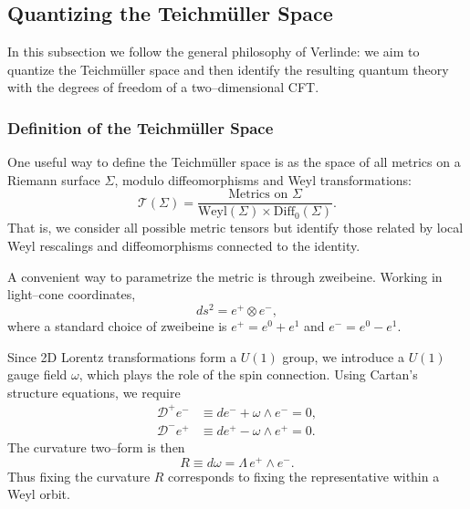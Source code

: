 \subsection{Quantizing the Teichmüller Space}

In this subsection we follow the general philosophy of Verlinde: 
we aim to quantize the Teichmüller space and then identify the resulting 
quantum theory with the degrees of freedom of a two–dimensional CFT.

\subsubsection{Definition of the Teichmüller Space}

One useful way to define the Teichmüller space is as the space of all metrics
on a Riemann surface $\Sigma$, modulo diffeomorphisms and Weyl transformations:
\begin{equation}
    \mathcal{T}(\Sigma)
    = \frac{\text{Metrics on }\Sigma}
    {\mathrm{Weyl}(\Sigma)\times \mathrm{Diff}_0(\Sigma)}.
\end{equation}
That is, we consider all possible metric tensors but identify those 
related by local Weyl rescalings and diffeomorphisms connected to the identity.

A convenient way to parametrize the metric is through zweibeine.  
Working in light–cone coordinates,
\begin{equation}
    ds^2 = e^{+} \otimes e^{-},
\end{equation}
where a standard choice of zweibeine is
$e^{+} = e^0 + e^1$ and $e^{-} = e^0 - e^1$.

Since 2D Lorentz transformations form a $U(1)$ group, 
we introduce a $U(1)$ gauge field $\omega$, which plays the role of the 
spin connection. Using Cartan's structure equations, we require
\begin{equation}
\begin{aligned}
    \mathcal{D}^{+} e^{-} 
    &\equiv de^{-} + \omega \wedge e^{-} = 0, \\
    \mathcal{D}^{-} e^{+} 
    &\equiv de^{+} - \omega \wedge e^{+} = 0.
\end{aligned}
\end{equation}
The curvature two–form is then
\begin{equation}
    R \equiv d\omega = \Lambda\, e^{+} \wedge e^{-}.
\end{equation}
Thus fixing the curvature $R$ corresponds to fixing the representative 
within a Weyl orbit.

